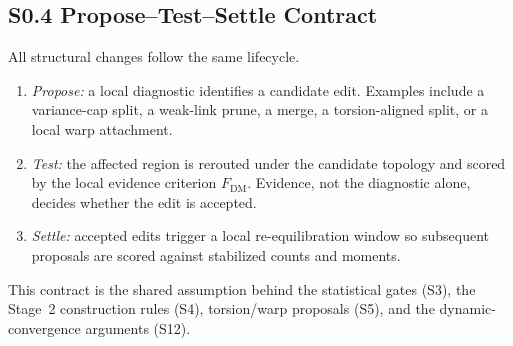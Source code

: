 \documentclass[11pt]{article}
\begin{document}
\subsection*{S0.4 Propose--Test--Settle Contract}
All structural changes follow the same lifecycle.
\begin{enumerate}[leftmargin=1.5em]
  \item \emph{Propose:} a local diagnostic identifies a candidate edit. Examples include a variance-cap split, a weak-link prune, a merge, a torsion-aligned split, or a local warp attachment.
  \item \emph{Test:} the affected region is rerouted under the candidate topology and scored by the local evidence criterion $F_{\mathrm{DM}}$. Evidence, not the diagnostic alone, decides whether the edit is accepted.
  \item \emph{Settle:} accepted edits trigger a local re-equilibration window so subsequent proposals are scored against stabilized counts and moments.
\end{enumerate}
This contract is the shared assumption behind the statistical gates (S3), the Stage~2 construction rules (S4), torsion/warp proposals (S5), and the dynamic-convergence arguments (S12).
\end{document}
